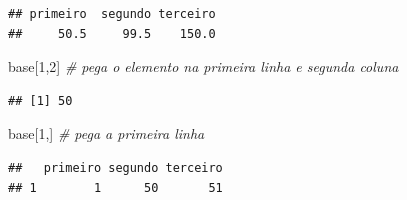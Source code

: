 \documentclass[
]{article}
\newenvironment{Shaded}{\begin{snugshade}}{\end{snugshade}}
\newcommand{\CommentTok}[1]{\textcolor[rgb]{0.56,0.35,0.01}{\textit{#1}}}
\newcommand{\DecValTok}[1]{\textcolor[rgb]{0.00,0.00,0.81}{#1}}
\newcommand{\NormalTok}[1]{#1}
\newcommand{\OperatorTok}[1]{\textcolor[rgb]{0.81,0.36,0.00}{\textbf{#1}}}
\newcommand{\StringTok}[1]{\textcolor[rgb]{0.31,0.60,0.02}{#1}}
\begin{document}
\begin{verbatim}
## primeiro  segundo terceiro 
##     50.5     99.5    150.0
\end{verbatim}

\begin{Shaded}
\begin{Highlighting}[]
\NormalTok{base[}\DecValTok{1}\NormalTok{,}\DecValTok{2}\NormalTok{] }\CommentTok{# pega o elemento na primeira linha e segunda coluna}
\end{Highlighting}
\end{Shaded}

\begin{verbatim}
## [1] 50
\end{verbatim}

\begin{Shaded}
\begin{Highlighting}[]
\NormalTok{base[}\DecValTok{1}\NormalTok{,] }\CommentTok{# pega a primeira linha}
\end{Highlighting}
\end{Shaded}

\begin{verbatim}
##   primeiro segundo terceiro
## 1        1      50       51
\end{verbatim}

\begin{Shaded}
\end{Shaded}
\end{document}
